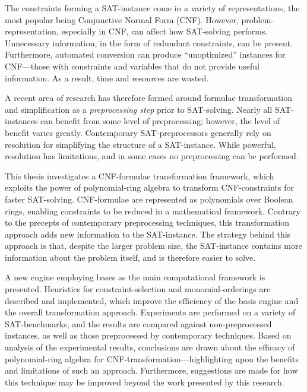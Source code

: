 The constraints forming a SAT-instance  come in a variety of
representations, the most popular being Conjunctive Normal Form (CNF).
However, problem-representation, especially in CNF, 
can affect how SAT-solving performs.
Unnecessary information, in the form of redundant constraints, 
can be present.  Furthermore, automated conversion can produce 
``unoptimized'' instances for CNF---those with constraints and variables 
that do not provide useful information.  As a result, time and resources 
are wasted.

A recent area 
of research has therefore formed around formulae transformation and 
simplification as a {\it preprocessing step} prior to SAT-solving.
Nearly all SAT-instances can benefit from some level of preprocessing;
however, the level of benefit varies greatly.  
Contemporary SAT-preprocessors
generally rely on resolution for simplifying the structure of a SAT-instance.
While powerful, resolution has limitations, and in some cases no preprocessing
can be performed.

This thesis investigates a CNF-formulae transformation framework, which exploits
the power of polynomial-ring algebra to transform CNF-constraints for faster
SAT-solving.  CNF-formulae are represented as polynomials over Boolean rings, 
enabling constraints to be reduced in a mathematical framework.  Contrary
to the precepts of contemporary preprocessing techniques, this transformation
approach adds new information to the SAT-instance.
The strategy behind this approach is that, despite the larger problem size, 
the SAT-instance contains more information about the problem itself, and is
therefore easier to solve.

A new engine employing \Grobner bases as the main computational
framework is presented.  Heuristics for 
constraint-selection and monomial-orderings are
described and implemented, which improve the efficiency of the \Grobner basis
engine and the overall transformation approach.  Experiments are performed on
a variety of SAT-benchmarks, and the
results are compared against non-preprocessed instances, as well as those
preprocessed by contemporary techniques.  Based on  analysis of the
experimental results, conclusions are drawn about the efficacy of 
polynomial-ring algebra for CNF-transformation---highlighting upon the
benefits and limitations of such an approach.   Furthermore, suggestions are
made for how this technique may be improved beyond the work
presented by this research.
